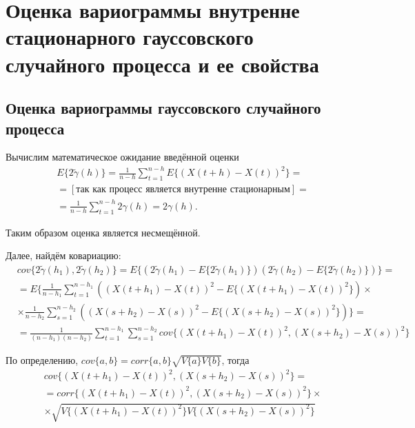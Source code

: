 \newpage

\chapter{Оценка вариограммы внутренне стационарного гауссовского случайного процесса и ее свойства}
\label{c:theory}

\section{Оценка вариограммы гауссовского случайного процесса} %
\label{sec:variogram_theory}

Вычислим математическое ожидание введённой оценки
\begin{eqnarray*}
	& E \{ 2 \tilde{\gamma}(h) \} = \frac{1}{n - h} \sum_{t = 1}^{n - h} E \{ (X(t + h) - X(t))^2 \} = \\
	& = [\text{так как процесс является внутренне стационарным}] = \\ %
	& = \frac{1}{n - h} \sum_{t = 1}^{n - h} 2 \gamma(h) = 2 \gamma(h).
\end{eqnarray*}

Таким образом оценка является несмещённой.

Далее, найдём ковариацию:
\begin{eqnarray}
\label{eq:cov_support}
\nonumber
	& cov\{ 2 \tilde{\gamma}(h_1), 2 \tilde{\gamma}(h_2) \} = E\{ (2 \tilde{\gamma}(h_1) - E\{ 2 \tilde{\gamma}(h_1) \}) (2 \tilde{\gamma}(h_2) - E\{ 2 \tilde{\gamma}(h_2) \}) \} = \\
\nonumber
	& = E\{ \frac{1}{n - h_1} \sum_{t = 1}^{n - h_1}((X(t + h_1) - X(t))^2 - E\{ (X(t + h_1) - X(t))^2 \}) \times \\
\nonumber
	& \times \frac{1}{n - h_2} \sum_{s = 1}^{n - h_2}((X(s + h_2) - X(s))^2 - E\{ (X(s + h_2) - X(s))^2 \}) \} = \\
	& = \frac{1}{(n - h_1)(n - h_2)} \sum_{t = 1}^{n - h_1}\sum_{s = 1}^{n - h_2} cov\{ (X(t + h_1) - X(t))^2, (X(s + h_2) - X(s))^2 \}
\end{eqnarray}

По определению, $ cov\{ a, b \} = corr\{ a, b \} \sqrt{ V\{ a \} V\{ b \} } $, тогда
\begin{eqnarray*}
	& cov\{ (X(t + h_1) - X(t))^2, (X(s + h_2) - X(s))^2 \} = \\
	& = corr\{(X(t + h_1) - X(t))^2, (X(s + h_2) - X(s))^2 \} \times \\
	& \times \sqrt{V\{ (X( t + h_1) - X(t))^2 \} V\{ (X(s + h_2) - X(s))^2 \}}
\end{eqnarray*}

